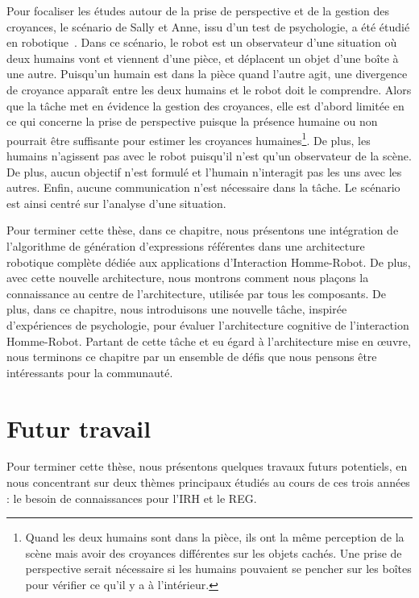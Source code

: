 Pour focaliser les études autour de la prise de perspective et de la gestion des croyances, le scénario de Sally et Anne, issu d'un test de psychologie, a été étudié en robotique~\cite{milliez_2014_framework}. Dans ce scénario, le robot est un observateur d'une situation où deux humains vont et viennent d'une pièce, et déplacent un objet d'une boîte à une autre. Puisqu'un humain est dans la pièce quand l'autre agit, une divergence de croyance apparaît entre les deux humains et le robot doit le comprendre. Alors que la tâche met en évidence la gestion des croyances, elle est d'abord limitée en ce qui concerne la prise de perspective puisque la présence humaine ou non pourrait être suffisante pour estimer les croyances humaines\footnote{Quand les deux humains sont dans la pièce, ils ont la même perception de la scène mais avoir des croyances différentes sur les objets cachés. Une prise de perspective serait nécessaire si les humains pouvaient se pencher sur les boîtes pour vérifier ce qu'il y a à l'intérieur.}. De plus, les humains n'agissent pas avec le robot puisqu'il n'est qu'un observateur de la scène. De plus, aucun objectif n'est formulé et l'humain n'interagit pas les uns avec les autres. Enfin, aucune communication n'est nécessaire dans la tâche. Le scénario est ainsi centré sur l'analyse d'une situation.

Pour terminer cette thèse, dans ce chapitre, nous présentons une intégration de l'algorithme de génération d'expressions référentes dans une architecture robotique complète dédiée aux applications d'Interaction Homme-Robot. De plus, avec cette nouvelle architecture, nous montrons comment nous plaçons la connaissance au centre de l'architecture, utilisée par tous les composants. De plus, dans ce chapitre, nous introduisons une nouvelle tâche, inspirée d'expériences de psychologie, pour évaluer l'architecture cognitive de l'interaction Homme-Robot. Partant de cette tâche et eu égard à l'architecture mise en œuvre, nous terminons ce chapitre par un ensemble de défis que nous pensons être intéressants pour la communauté.

\section*{Futur travail}

Pour terminer cette thèse, nous présentons quelques travaux futurs potentiels, en nous concentrant sur deux thèmes principaux étudiés au cours de ces trois années : le besoin de connaissances pour l'IRH et le REG.

